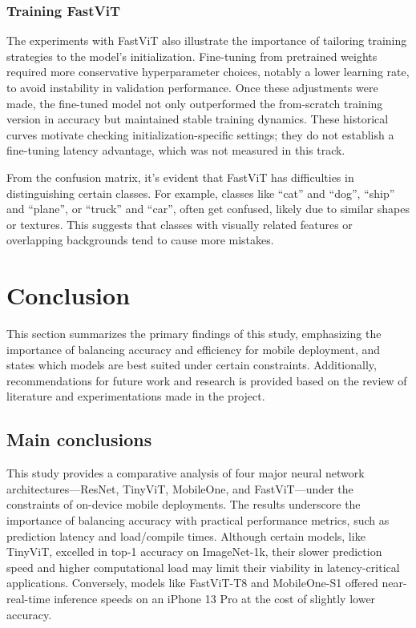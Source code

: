 \documentclass[12pt]{article}
\begin{document}
\subsubsection{Training FastViT}
The experiments with FastViT also illustrate the importance of tailoring training strategies to the model’s initialization. Fine-tuning from pretrained weights required more conservative hyperparameter choices, notably a lower learning rate, to avoid instability in validation performance. Once these adjustments were made, the fine-tuned model not only outperformed the from-scratch training version in accuracy but maintained stable training dynamics. These historical curves motivate checking initialization-specific settings; they do not establish a fine-tuning latency advantage, which was not measured in this track.

From the confusion matrix, it’s evident that FastViT has difficulties in distinguishing certain classes. For example, classes like ``cat'' and ``dog'', ``ship'' and ``plane'', or ``truck'' and ``car'', often get confused, likely due to similar shapes or textures. This suggests that classes with visually related features or overlapping backgrounds tend to cause more mistakes.

\section{Conclusion}
This section summarizes the primary findings of this study, emphasizing the importance of balancing accuracy and efficiency for mobile deployment, and states which models are best suited under certain constraints. Additionally, recommendations for future work and research is provided based on the review of literature and experimentations made in the project.

\subsection{Main conclusions}

This study provides a comparative analysis of four major neural network architectures—ResNet, TinyViT, MobileOne, and FastViT—under the constraints of on-device mobile deployments. The results underscore the importance of balancing accuracy with practical performance metrics, such as prediction latency and load/compile times. Although certain models, like TinyViT, excelled in top-1 accuracy on ImageNet-1k, their slower prediction speed and higher computational load may limit their viability in latency-critical applications. Conversely, models like FastViT-T8 and MobileOne-S1 offered near-real-time inference speeds on an iPhone 13 Pro at the cost of slightly lower accuracy.
\end{document}
